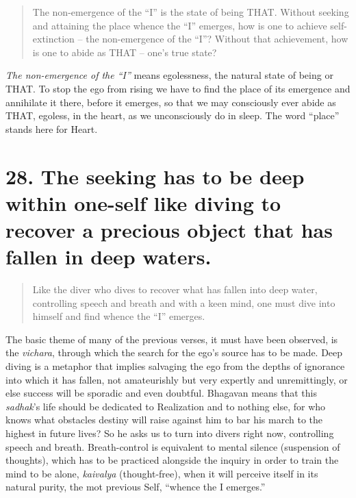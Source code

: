\documentclass[12pt]{report}
\begin{document}
\begin{quote}

  The non-emergence of the ``I'' is the state of being THAT. Without
  seeking and attaining the place whence the ``I'' emerges, how is one
  to achieve self-extinction -- the non-emergence of the ``I''?
  Without that achievement, how is one to abide as THAT -- one's true
  state? 

\end{quote}

\index{}

\emph{The non-emergence of the ``I''} means egolessness, the natural
state of being or THAT. To stop the ego from rising we have to find
the place of its emergence and annihilate it there, before it
emerges, so that we may consciously ever abide as THAT, egoless, in
the heart, as we unconsciously do in sleep. The word ``place''
stands here for Heart.

\section{28. The seeking has to be deep within one-self like diving to
  recover a precious object that has fallen in deep waters.} 

\begin{quote}
  Like the diver who dives to recover what has fallen into deep water,
  controlling speech and breath and with a keen mind, one must dive
  into himself and find whence the ``I'' emerges.
\end{quote}

The basic theme of many of the previous verses, it must have been
observed, is the \emph{vichara}, through which the search for the
ego's source has to be made. Deep diving is a metaphor that implies
salvaging the ego from the depths of ignorance into which it has
fallen, not amateurishly but very expertly and unremittingly, or else
success will be sporadic and even doubtful. Bhagavan means that this
\emph{sadhak}'s life should be dedicated to Realization and to nothing
else, for who knows what obstacles destiny will raise against him to
bar his march to the highest in future lives? So he asks us to turn
into divers right now, controlling speech and breath. Breath-control is
equivalent to mental silence (suspension of thoughts), which has to be
practiced alongside the inquiry in order to train the mind to be
alone, \emph{kaivalya} (thought-free), when it will perceive itself in
its natural purity, the mot previous Self, ``whence the I emerges.''
\end{document}
